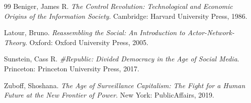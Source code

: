 \documentclass[12pt]{article}
\begin{document}
\begin{thebibliography}{99}
Beniger, James R.
\textit{The Control Revolution: Technological and Economic Origins of the Information Society}.
Cambridge: Harvard University Press, 1986.

Latour, Bruno.
\textit{Reassembling the Social: An Introduction to Actor-Network-Theory}.
Oxford: Oxford University Press, 2005.

Sunstein, Cass R.
\textit{\#Republic: Divided Democracy in the Age of Social Media}.
Princeton: Princeton University Press, 2017.

Zuboff, Shoshana.
\textit{The Age of Surveillance Capitalism: The Fight for a Human Future at the New Frontier of Power}.
New York: PublicAffairs, 2019.

\end{thebibliography}
\end{document}

